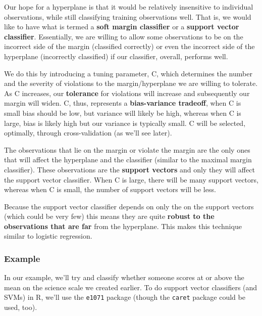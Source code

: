\documentclass[]{book}
\newenvironment{Shaded}{\begin{snugshade}}{\end{snugshade}}
\newcommand{\CommentTok}[1]{\textcolor[rgb]{0.56,0.35,0.01}{\textit{#1}}}
\newcommand{\ControlFlowTok}[1]{\textcolor[rgb]{0.13,0.29,0.53}{\textbf{#1}}}
\newcommand{\KeywordTok}[1]{\textcolor[rgb]{0.13,0.29,0.53}{\textbf{#1}}}
\newcommand{\NormalTok}[1]{#1}
\newcommand{\OperatorTok}[1]{\textcolor[rgb]{0.81,0.36,0.00}{\textbf{#1}}}
\newcommand{\StringTok}[1]{\textcolor[rgb]{0.31,0.60,0.02}{#1}}
\begin{document}
Our hope for a hyperplane is that it would be relatively insensitive to individual observations, while still classifying training observations well. That is, we would like to have what is termed a \textbf{soft margin classifier} or a \textbf{support vector classifier}. Essentially, we are willing to allow some observations to be on the incorrect side of the margin (classified correctly) or even the incorrect side of the hyperplane (incorrectly classified) if our classifier, overall, performs well.

We do this by introducing a tuning parameter, C, which determines the number and the severity of violations to the margin/hyperplane we are willing to tolerate. As C increases, our \textbf{tolerance} for violations will increase and subsequently our margin will widen. C, thus, represents a \textbf{bias-variance tradeoff}, when C is small bias should be low, but variance will likely be high, whereas when C is large, bias is likely high but our variance is typically small. C will be selected, optimally, through cross-validation (as we'll see later).

The observations that lie on the margin or violate the margin are the only ones that will affect the hyperplane and the classifier (similar to the maximal margin classifier). These observations are the \textbf{support vectors} and only they will affect the support vector classifier. When C is large, there will be many support vectors, whereas when C is small, the number of support vectors will be less.

Because the support vector classifier depends on only the on the support vectors (which could be very few) this means they are quite \textbf{robust to the observations that are far} from the hyperplane. This makes this technique similar to logistic regression.

\hypertarget{example}{%
\subsubsection{Example}\label{example}}

In our example, we'll try and classify whether someone scores at or above the mean on the science scale we created earlier. To do support vector classifiers (and SVMs) in R, we'll use the \texttt{e1071} package (though the \texttt{caret} package could be used, too).

\begin{Shaded}
\end{Shaded}
\end{document}

